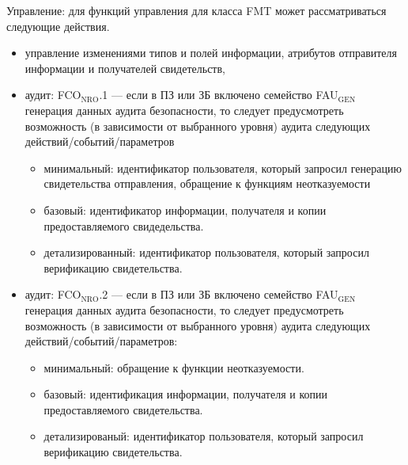 \documentclass[12pt, russian, oneside, article]{ncc}
\begin{document}
Управление: для функций управления для класса FMT может рассматриваться следующие действия.
\begin{itemize}
\item управление изменениями типов и полей информации, атрибутов отправителя информации и получателей свидетельств,
\item аудит:  FCO$_{\mathrm{NRO}}$.1 --- если в ПЗ или ЗБ включено семейство FAU$_{\mathrm{GEN}}$ генерация данных аудита безопасности, то следует предусмотреть возможность (в зависимости от выбранного уровня) аудита следующих действий/событий/параметров

\begin{itemize}
\item минимальный: идентификатор пользователя, который запросил генерацию свидетельства отправления, обращение к функциям неотказуемости
\item базовый: идентификатор информации, получателя и копии предоставляемого свидедельства.
\item детализированный: идентификатор пользователя, который запросил  верификацию свидетельства.
\end{itemize}

\item аудит: FCO$_{\mathrm{NRO}}$.2 --- если в ПЗ или ЗБ включено семейство FAU$_{\mathrm{GEN}}$ генерация данных аудита безопасности, то следует предусмотреть возможность (в зависимости от выбранного уровня) аудита следующих действий/событий/параметров:

\begin{itemize}
\item минимальный: обращение к функции неотказуемости.
\item базовый: идентификация информации, получателя и копии предоставляемого свидетельства.
\item детализированый: идентификатор пользователя, который запросил верификацию свидетельства.
\end{itemize}

\end{itemize}
\end{document}
